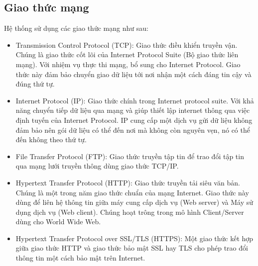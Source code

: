 \documentclass[a4paper, 12pt]{article}
\begin{document}
\subsection{Giao thức mạng}
	Hệ thống sử dụng các giao thức mạng như sau:
	\begin{itemize}
		\item Transmission Control Protocol (TCP): Giao thức điều khiển truyền vận. Chúng là giao thức cốt lõi của Internet Protocol Suite (Bộ giao thức liên mạng). Với nhiệm vụ thực thi mạng, bổ sung cho Internet Protocol. Giao thức này đảm bảo chuyển giao dữ liệu tới nơi nhận một cách đáng tin cậy và đúng thứ tự.
		\item Internet Protocol (IP): Giao thức chính trong Internet protocol suite. Với khả năng chuyển tiếp dữ liệu qua mạng và giúp thiết lập internet thông qua việc định tuyến  của Internet Protocol. IP cung cấp một dịch vụ gửi dữ liệu không đảm bảo  nên gói dữ liệu có thể đến nơi mà không còn nguyên vẹn, nó có thể đến không theo thứ tự.
		\item File Transfer Protocol (FTP): Giao thức truyền tập tin để trao đổi tập tin qua mạng lưới truyền thông dùng giao thức TCP/IP.
		\item Hypertext Transfer Protocol (HTTP): Giao thức truyền tải siêu văn bản. Chúng là một trong năm giao thức chuẩn của mạng Internet. Giao thức này dùng để liên hệ thông tin giữa máy cung cấp dịch vụ (Web server) và Máy sử dụng dịch vụ (Web client). Chúng hoạt trông trong mô hình Client/Server dùng cho World Wide Web.
		\item Hypertext Transfer Protocol over SSL/TLS (HTTPS): Một giao thức kết hợp giữa giao thức HTTP và giao thức bảo mật SSL hay TLS cho phép trao đổi thông tin một cách bảo mật trên Internet.
	\end{itemize}
	\clearpage
\end{document}

